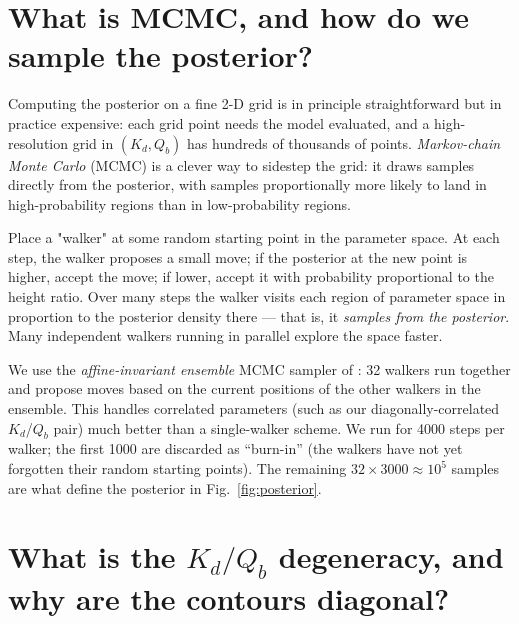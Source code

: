 \documentclass[11pt]{report}
\begin{document}
\section{What is MCMC, and how do we sample the posterior?}

Computing the posterior on a fine 2-D grid is in principle
straightforward but in practice expensive: each grid point needs
the model evaluated, and a high-resolution grid in $(K_d, Q_b)$
has hundreds of thousands of points. \emph{Markov-chain
Monte Carlo} (MCMC) is a clever way to sidestep the grid: it
draws samples directly from the posterior, with samples
proportionally more likely to land in high-probability regions
than in low-probability regions.

\begin{aside}
Place a "walker" at some random starting point in the parameter
space. At each step, the walker proposes a small move; if the
posterior at the new point is higher, accept the move; if lower,
accept it with probability proportional to the height ratio. Over
many steps the walker visits each region of parameter space in
proportion to the posterior density there --- that is, it
\emph{samples from the posterior}. Many independent walkers
running in parallel explore the space faster.
\end{aside}

\begin{aside}
We use the \emph{affine-invariant ensemble} MCMC sampler of
\citet{foreman_mackey2013emcee}: 32 walkers run together and propose
moves based on the current positions of the other walkers in the
ensemble. This handles correlated parameters (such as our
diagonally-correlated $K_d$/$Q_b$ pair) much better than a
single-walker scheme. We run for 4000 steps per walker; the first
1000 are discarded as ``burn-in'' (the walkers have not yet
forgotten their random starting points). The remaining
$32 \times 3000 \approx 10^5$ samples are what define the posterior
in Fig.~\ref{fig:posterior}.
\end{aside}

\section{What is the $K_d/Q_b$ degeneracy, and why are the
contours diagonal?}
\end{document}
